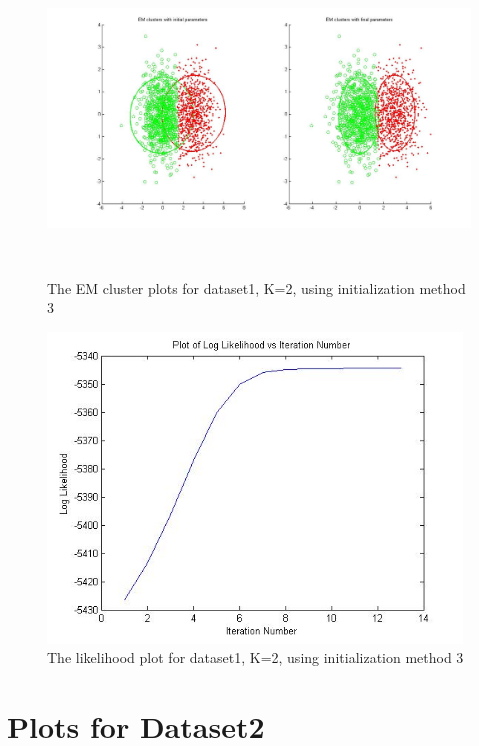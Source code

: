\documentclass[11pt,psfig]{article}
\begin{document}
\begin{figure}[H]
\centering
\includegraphics[height=3.25in]{dataset1_EMclusterPlots.jpg}
\caption{The EM cluster plots for dataset1, K=2, using initialization method 3}
\end{figure}

\begin{figure}[H]
\centering
\includegraphics[height=3.25in]{dataset1_EMlogLikelihoodPlot.jpg}
\caption{The likelihood plot for dataset1, K=2, using initialization method 3}
\end{figure}

\section*{Plots for Dataset2}
\end{document}
